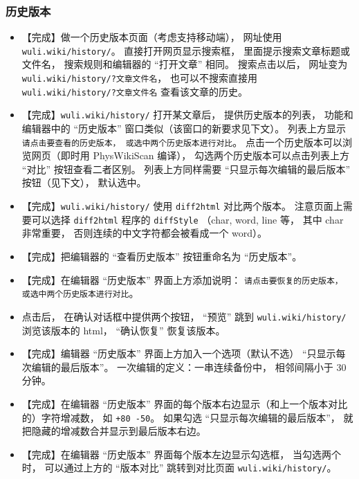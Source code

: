 \subsubsection{历史版本}
\begin{itemize}
\item 【完成】做一个历史版本页面（考虑支持移动端）， 网址使用 \verb`wuli.wiki/history/`。 直接打开网页显示搜索框， 里面提示搜索文章标题或文件名， 搜索规则和编辑器的 “打开文章” 相同。 搜索点击以后， 网址变为 \verb`wuli.wiki/history/?文章文件名`， 也可以不搜索直接用 \verb`wuli.wiki/history/?文章文件名` 查看该文章的历史。

\item 【完成】\verb`wuli.wiki/history/` 打开某文章后， 提供历史版本的列表， 功能和编辑器中的 “历史版本” 窗口类似（该窗口的新要求见下文）。 列表上方显示 \verb`请点击要查看的历史版本， 或选中两个历史版本进行对比`。 点击一个历史版本可以浏览网页（即时用 PhysWikiScan 编译）， 勾选两个历史版本可以点击列表上方 “对比” 按钮查看二者区别。 列表上方同样需要 “只显示每次编辑的最后版本” 按钮（见下文）， 默认选中。

\item 【完成】\verb`wuli.wiki/history/` 使用 \verb`diff2html` 对比两个版本。 注意页面上需要可以选择 \verb`diff2html` 程序的 \verb`diffStyle` （char, word, line 等， 其中 char 非常重要， 否则连续的中文字符都会被看成一个 word）。

\item 【完成】把编辑器的 “查看历史版本” 按钮重命名为 “历史版本”。

\item 【完成】在编辑器 “历史版本” 界面上方添加说明： \verb`请点击要恢复的历史版本， 或选中两个历史版本进行对比`。

\item 点击后， 在确认对话框中提供两个按钮， “预览” 跳到 \verb`wuli.wiki/history/` 浏览该版本的 html， “确认恢复” 恢复该版本。

\item 【完成】编辑器 “历史版本” 界面上方加入一个选项（默认不选） “只显示每次编辑的最后版本”。 一次编辑的定义：一串连续备份中， 相邻间隔小于 30 分钟。

\item 【完成】在编辑器 “历史版本” 界面的每个版本右边显示（和上一个版本对比的）字符增减数， 如 \verb`+80 -50`。 如果勾选 “只显示每次编辑的最后版本”， 就把隐藏的增减数合并显示到最后版本右边。

\item 【完成】在编辑器 “历史版本” 界面每个版本左边显示勾选框， 当勾选两个时， 可以通过上方的 “版本对比” 跳转到对比页面 \verb`wuli.wiki/history/`。
\end{itemize}

